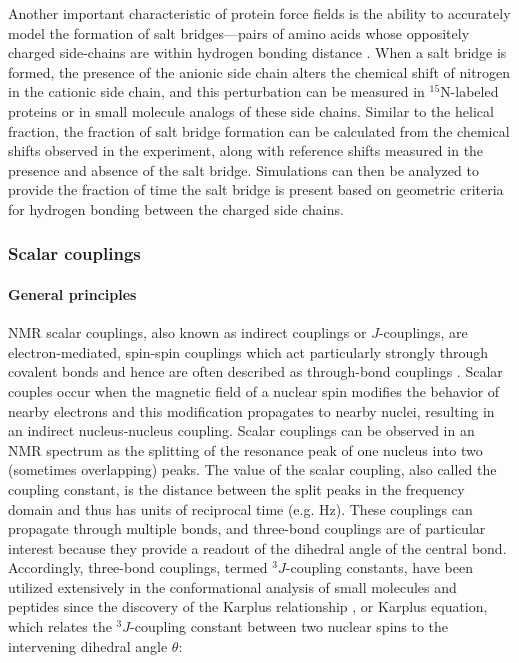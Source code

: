 \documentclass[9pt,review]{livecoms}
\begin{document}
Another important characteristic of protein force fields is the ability to accurately model the formation of salt bridges---pairs of amino acids whose oppositely charged side-chains are within hydrogen bonding distance \cite{donald_salt_2011}.
When a salt bridge is formed, the presence of the anionic side chain alters the chemical shift of nitrogen in the cationic side chain, and this perturbation can be measured in $^{15}$N-labeled proteins \cite{tomlinson2009characterization} or in small molecule analogs of these side chains.
Similar to the helical fraction, the fraction of salt bridge formation can be calculated from the chemical shifts observed in the experiment, along with reference shifts measured in the presence and absence of the salt bridge.
Simulations can then be analyzed to provide the fraction of time the salt bridge is present based on geometric criteria for hydrogen bonding between the charged side chains.

\subsubsection{Scalar couplings}
\label{sub2:j_coupling}

\paragraph{General principles}

NMR scalar couplings, also known as indirect couplings or $J$-couplings, are electron-mediated, spin-spin couplings which act particularly strongly through covalent bonds and hence are often described as through-bond couplings \cite{karplus_contact_1959,karplus_vicinal_1963}. Scalar couples occur when the magnetic field of a nuclear spin modifies the behavior of nearby electrons and this modification propagates to nearby nuclei, resulting in an indirect nucleus-nucleus coupling.
Scalar couplings can be observed in an NMR spectrum as the splitting of the resonance peak of one nucleus into two (sometimes overlapping) peaks.
The value of the scalar coupling, also called the coupling constant, is the distance between the split peaks in the frequency domain and thus has units of reciprocal time (e.g. Hz).
These couplings can propagate through multiple bonds, and three-bond couplings are of particular interest because they provide a readout of the dihedral angle of the central bond. Accordingly, three-bond couplings, termed $^3J$-coupling constants, have been utilized extensively in the conformational analysis of small molecules \cite{karplus_vicinal_1963} and peptides \cite{bystrov_spinspin_1976} since the discovery of the Karplus relationship \cite{karplus_contact_1959}, or Karplus equation, which relates the $^3J$-coupling constant between two nuclear spins to the intervening dihedral angle $\theta$:
\end{document}
